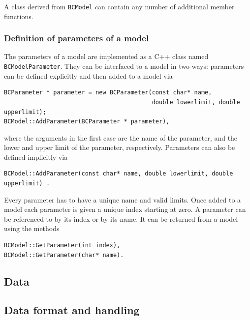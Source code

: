 \documentclass[11pt, a4paper]{article}
\begin{document}
\noindent 
A class derived from \verb|BCModel| can contain any number of
additional member functions.


\subsubsection{Definition of parameters of a model} 
\label{subsubsection:parameters}

The parameters of a model are implemented as a C++ class named
\verb|BCModelParameter|. They can be interfaced to a model in two
ways: parameters can be defined explicitly and then added to a model
via
%
\begin{verbatim}
BCParameter * parameter = new BCParameter(const char* name, 
                                          double lowerlimit, double upperlimit); 
BCModel::AddParameter(BCParameter * parameter),
\end{verbatim}

\noindent 
where the arguments in the first case are the name of the parameter,
and the lower and upper limit of the parameter,
respectively. Parameters can also be defined implicitly via
%
\begin{verbatim}
BCModel::AddParameter(const char* name, double lowerlimit, double upperlimit) . 
\end{verbatim}

\noindent 
Every parameter has to have a unique name and valid limits. Once added
to a model each parameter is given a unique index starting at zero. A
parameter can be referenced to by its index or by its name. It can be
returned from a model using the methods
% 
\begin{verbatim} 
BCModel::GetParameter(int index), 
BCModel::GetParameter(char* name). 
\end{verbatim}  


\subsection{Data} 
\label{subsection:data} 

\subsection{Data format and handling} 
\label{subsection:dataformat} 
\end{document}
